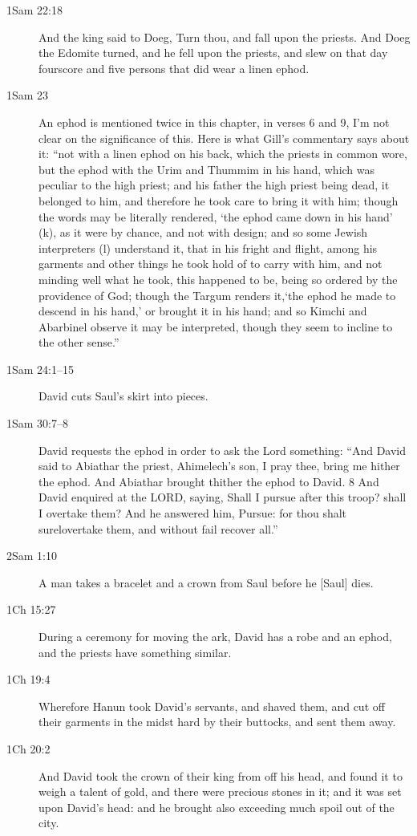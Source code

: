 \begin{description}
		\item[1Sam 22:18] And the king said to Doeg, Turn thou, and fall upon the priests. And Doeg the Edomite turned, and he fell upon the priests, and slew on that day fourscore and five persons that did wear a linen ephod.
		\item[1Sam 23] An ephod is mentioned twice in this chapter, in verses 6 and 9, I'm not clear on the significance of this. Here is what Gill's commentary says about it: ``not with a linen ephod on his back, which the priests in common wore, but the ephod with the Urim and Thummim in his hand, which was peculiar to the high priest; and his father the high priest being dead, it belonged to him, and therefore he took care to bring it with him; though the words may be literally rendered, `the ephod came down in his hand' (k), as it were by chance, and not with design; and so some Jewish interpreters (l) understand it, that in his fright and flight, among his garments and other things he took hold of to carry with him, and not minding well what he took, this happened to be, being so ordered by the providence of God; though the Targum renders it,`the ephod he made to descend in his hand,' or brought it in his hand; and so Kimchi and Abarbinel observe it may be interpreted, though they seem to incline to the other sense.''
		\item[1Sam 24:1--15] David cuts Saul's skirt into pieces.
		\item[1Sam 30:7--8] David requests the ephod in order to ask the Lord something: ``And David said to Abiathar the priest, Ahimelech's son, I pray thee, bring me hither the ephod. And Abiathar brought thither the ephod to David. 8 And David enquired at the LORD, saying, Shall I pursue after this troop? shall I overtake them? And he answered him, Pursue: for thou shalt surelovertake them, and without fail recover all.''
		\item[2Sam 1:10] A man takes a bracelet and a crown from Saul before he [Saul] dies.
		\item[1Ch 15:27] During a ceremony for moving the ark, David has a robe and an ephod, and the priests have something similar.
		\item[1Ch 19:4] Wherefore Hanun took David's servants, and shaved them, and cut off their garments in the midst hard by their buttocks, and sent them away.
		\item[1Ch 20:2] And David took the crown of their king from off his head, and found it to weigh a talent of gold, and there were precious stones in it; and it was set upon David's head: and he brought also exceeding much spoil out of the city.

\end{description}
